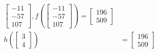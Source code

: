 \begin{example}
\begin{align*}
\begin{bmatrix}
            -11 \\ -57 \\ 107
        \end{bmatrix}, f \left( \begin{bmatrix}
            -11 \\ -57 \\ 107
        \end{bmatrix} \right) = \begin{bmatrix}
            196 \\ 509
        \end{bmatrix}           \\
        h(\begin{bmatrix}
            3 \\ 4
        \end{bmatrix})               & = \begin{bmatrix}
            196 \\ 509
        \end{bmatrix}
    \end{align*}
\end{example}
